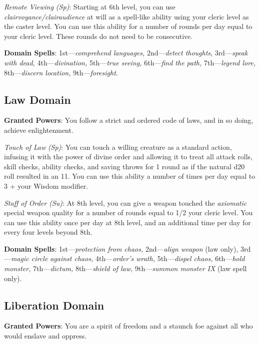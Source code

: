 \textit{Remote Viewing} \textit{(Sp)}: Starting at 6th level, you can use \textit{clairvoyance/clairaudience} at will as a spell-like ability using your cleric level as the caster level. You can use this ability for a number of rounds per day equal to your cleric level. These rounds do not need to be consecutive.
				
\textbf{Domain Spells}: 1st---\textit{comprehend languages, }2nd---\textit{detect thoughts}, 3rd---\textit{speak with dead, }4th---\textit{divination, }5th---\textit{true seeing, }6th---\textit{find the path, }7th---\textit{legend lore, }8th---\textit{discern location, }9th---\textit{foresight}.
				
\subsection{Law Domain}

				
\textbf{Granted Powers}: You follow a strict and ordered code of laws, and in so doing, achieve enlightenment.
				
\textit{Touch of Law} \textit{(Sp)}: You can touch a willing creature as a standard action, infusing it with the power of divine order and allowing it to treat all attack rolls, skill checks, ability checks, and saving throws for 1 round as if the natural d20 roll resulted in an 11. You can use this ability a number of times per day equal to 3 + your Wisdom modifier. 
				
\textit{Staff of Order (Su)}: At 8th level, you can give a weapon touched the\textit{ axiomatic }special weapon quality for a number of rounds equal to 1/2 your cleric level. You can use this ability once per day at 8th level, and an additional time per day for every four levels beyond 8th.
				
\textbf{Domain Spells}: 1st---\textit{protection from chaos, }2nd---\textit{align weapon }(law only), 3rd---\textit{magic circle against chaos, }4th---\textit{order's wrath, }5th---\textit{dispel chaos, }6th---\textit{hold monster, }7th---\textit{dictum, }8th---\textit{shield of law, }9th---\textit{summon monster IX} (law spell only). 
				
\subsection{Liberation Domain}

				
\textbf{Granted Powers}: You are a spirit of freedom and a staunch foe against all who would enslave and oppress.
				
